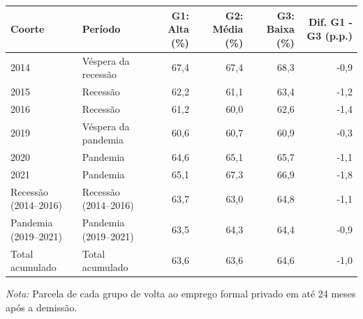 \providecommand{\toprule}{\hline\hline}
\providecommand{\midrule}{\hline}
\providecommand{\bottomrule}{\hline\hline}
\providecommand{\addlinespace}[1][]{}
{\small
\renewcommand{\arraystretch}{1.12}
\begin{tabular}{llrrrr}
\toprule
Coorte & Período & G1: Alta (\%) & G2: Média (\%) & G3: Baixa (\%) & Dif. G1 - G3 (p.p.) \\
\midrule
2014 & Véspera da recessão & 67,4 & 67,4 & 68,3 & -0,9 \\
2015 & Recessão & 62,2 & 61,1 & 63,4 & -1,2 \\
2016 & Recessão & 61,2 & 60,0 & 62,6 & -1,4 \\
2019 & Véspera da pandemia & 60,6 & 60,7 & 60,9 & -0,3 \\
2020 & Pandemia & 64,6 & 65,1 & 65,7 & -1,1 \\
2021 & Pandemia & 65,1 & 67,3 & 66,9 & -1,8 \\
Recessão (2014–2016) & Recessão (2014–2016) & 63,7 & 63,0 & 64,8 & -1,1 \\
Pandemia (2019–2021) & Pandemia (2019–2021) & 63,5 & 64,3 & 64,4 & -0,9 \\
Total acumulado & Total acumulado & 63,6 & 63,6 & 64,6 & -1,0 \\
\bottomrule
\end{tabular}
\vspace{2pt}
\par{\footnotesize \textit{Nota:} Parcela de cada grupo de volta ao emprego formal privado em até 24 meses após a demissão.}
}
